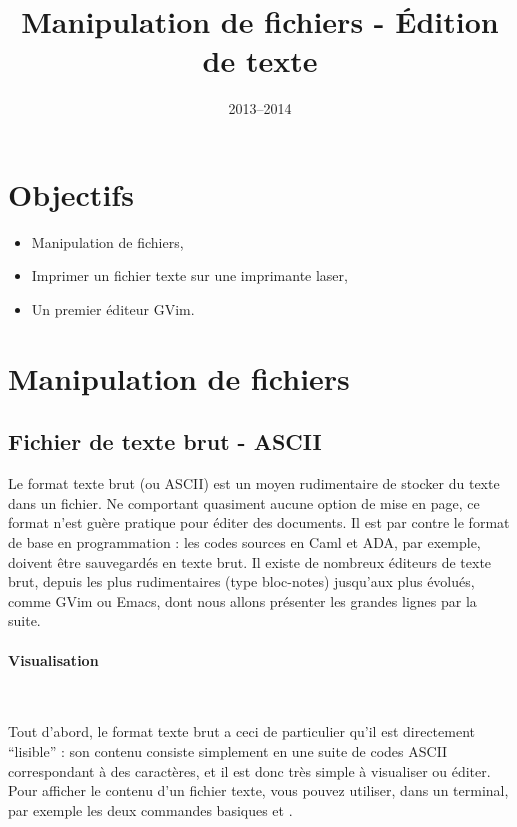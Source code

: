 \documentclass[a4paper,10pt]{article}
\title{Manipulation de fichiers - Édition de texte}
\date{2013--2014}
\begin{document}
\maketitle

\section*{Objectifs}
\begin{itemize}
  \item Manipulation de fichiers,
  \item Imprimer un fichier texte sur une imprimante laser,
  \item Un premier éditeur GVim.
\end{itemize}


\section{Manipulation de fichiers}

\subsection{Fichier de texte brut - ASCII}

Le format texte brut (ou ASCII) est un moyen rudimentaire de stocker du texte dans un fichier. 
Ne comportant quasiment aucune option de mise en page, ce format
n'est guère pratique pour éditer des documents.
Il est par contre le format de base en programmation : les codes sources
en Caml et ADA, par exemple, doivent être sauvegardés en texte brut.
Il existe de nombreux éditeurs de texte brut, depuis les plus rudimentaires
(type bloc-notes) jusqu'aux plus évolués, comme GVim ou Emacs, dont nous
allons présenter les grandes lignes par la suite.

\paragraph{Visualisation}

\

Tout d'abord, le format texte brut a ceci de particulier qu'il est directement
``lisible'' : son contenu consiste simplement en une suite de codes ASCII
correspondant à des caractères, et il est donc très simple à visualiser ou
éditer.
Pour afficher le contenu d'un fichier texte, vous pouvez utiliser, dans un
terminal, par exemple
les deux commandes basiques  et .
\end{document}
